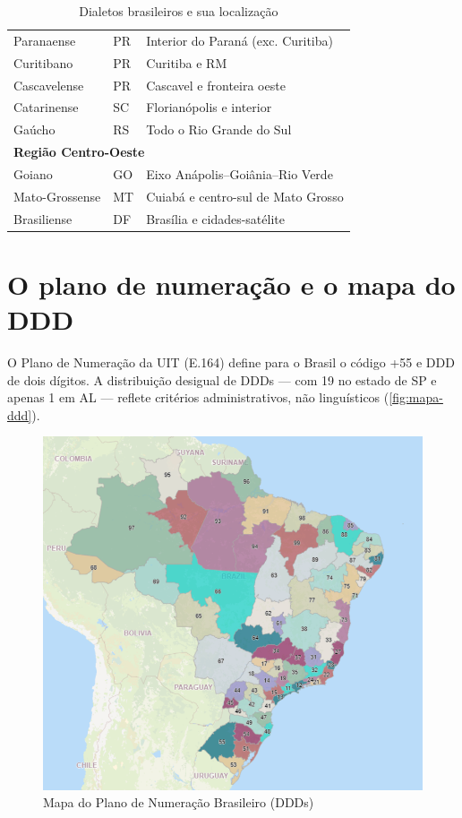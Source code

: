 \begin{table}[ht]
\begin{tabular}{lll}
Paranaense   & PR                    & Interior do Paraná (exc. Curitiba) \\
Curitibano   & PR                    & Curitiba e RM                      \\
Cascavelense & PR                    & Cascavel e fronteira oeste         \\
Catarinense  & SC                    & Florianópolis e interior           \\
Gaúcho       & RS                    & Todo o Rio Grande do Sul           \\
\hline
\multicolumn{3}{l}{\textbf{Região Centro-Oeste}} \\ \hline
Goiano         & GO & Eixo Anápolis–Goiânia–Rio Verde  \\
Mato-Grossense & MT & Cuiabá e centro-sul de Mato Grosso \\
Brasiliense    & DF & Brasília e cidades-satélite        \\
\hline
\end{tabular}
\caption{Dialetos brasileiros e sua localização}
\label{tab:tabela-ddd-local}
\end{table}



\section{O plano de numeração e o mapa do DDD}
O Plano de Numeração da UIT (E.164) define para o Brasil o código +55 e DDD de dois dígitos. A distribuição desigual de DDDs — com 19 no estado de SP e apenas 1 em AL — reflete critérios administrativos, não linguísticos (\autoref{fig:mapa-ddd}).

\begin{figure}[ht]
  \centering
  \includegraphics[width=\linewidth]{images/mapa_ddd_brasil.png}
  \caption{Mapa do Plano de Numeração Brasileiro (DDDs)}
  \label{fig:mapa-ddd}
\end{figure}

